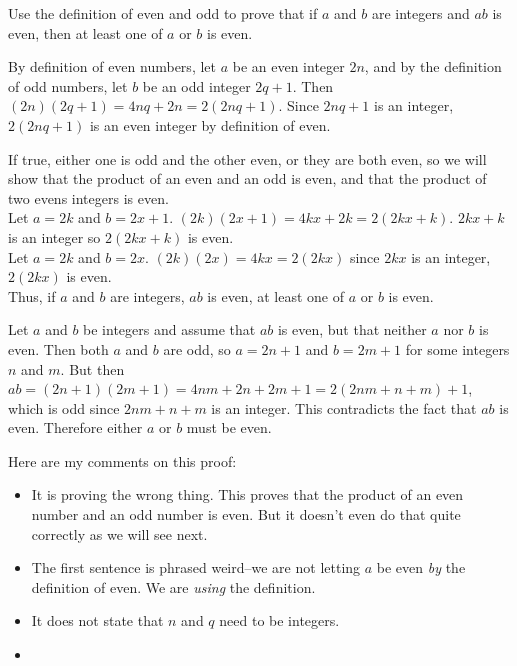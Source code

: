 \begin{eval}\label{eval:abeven}
Use the definition of even and odd to prove that if $a$ and $b$ are integers and $ab$ is even, then
at least one of $a$ or $b$ is even.
\begin{spfenum}
\item
By definition of even numbers, let $a$ be an even integer $2n$, and by
the definition of odd numbers, let $b$ be an odd integer $2q+1$.
Then $(2n)(2q+1)=4nq+2n=2(2nq+1)$.
Since $2nq+1$ is an integer, $2(2nq+1)$ is an even integer by definition of even.\\
\evallinethree
\item
If true, either one is odd and the other even, or they are both even, so we will show that
the product of an even and an odd is even, and that the product of two evens integers is even.\\
Let $a=2k$ and $b=2x+1$. 
$(2k)(2x+1)=4kx+2k=2(2kx+k)$.  $2kx+k$ is an integer so $2(2kx+k)$ is even.\\
Let $a=2k$ and $b=2x$.  $(2k)(2x)=4kx=2(2kx)$ since $2kx$ is an integer, $2(2kx)$ is even.\\
Thus, if $a$ and $b$ are integers, $ab$ is even, at least one of $a$ or $b$ is even.\\
\evallinetwo
\item
Let $a$ and $b$ be integers and assume that $ab$ is even, but that neither $a$ nor $b$ is even.
Then both $a$ and $b$ are odd, so $a=2n+1$ and $b=2m+1$ for some integers $n$ and $m$.  But then
$ab=(2n+1)(2m+1)=4nm+2n+2m+1=2(2nm+n+m)+1$, which is odd since $2nm+n+m$ is an integer.
This contradicts the fact that $ab$ is even.  Therefore either $a$ or $b$ must be even.\\
\evallinethree
\end{spfenum}
\begin{answer}
\begin{pfevalenum}
\item
Here are my comments on this proof:
\begin{itemize}
\item
It is proving the wrong thing.  This proves that the product of an even number and
an odd number is even.  But it doesn't even do that quite correctly as we will see next.
\item
The first sentence is phrased weird--we are not letting $a$ be even {\em by} the definition of even.
We are {\em using} the definition.
\item
It does not state that $n$ and $q$ need to be integers.
\item

\end{itemize}
\end{pfevalenum}
\end{answer}
\end{eval}
